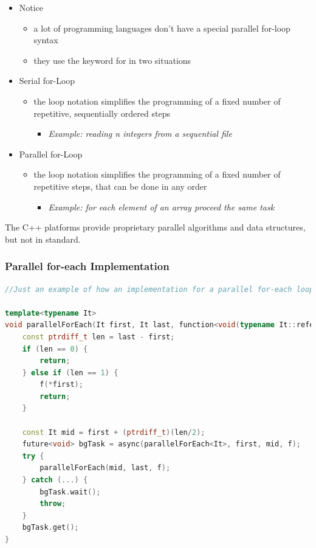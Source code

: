 \begin{itemize}
\tightlist
\item
  Notice

  \begin{itemize}
  \tightlist
  \item
    a lot of programming languages don't have a special parallel
    for-loop syntax
  \item
    they use the keyword for in two situations
  \end{itemize}
\item
  Serial for-Loop

  \begin{itemize}
  \tightlist
  \item
    the loop notation simplifies the programming of a fixed number of
    repetitive, sequentially ordered steps

    \begin{itemize}
    \tightlist
    \item
      \textit{Example: reading n integers from a sequential file}
    \end{itemize}
  \end{itemize}
\item
  Parallel for-Loop

  \begin{itemize}
  \tightlist
  \item
    the loop notation simplifies the programming of a fixed number of
    repetitive steps, that can be done in any order

    \begin{itemize}
    \tightlist
    \item
      \textit{Example: for each element of an array proceed the same task}
    \end{itemize}
  \end{itemize}
\end{itemize}

The C++ platforms provide proprietary parallel algorithms and data
structures, but not in standard.

\hypertarget{parallel-for-each-implementation}{%
\subsubsection{Parallel for-each
Implementation}\label{parallel-for-each-implementation}}

\begin{lstlisting}[language=C++]
//Just an example of how an implementation for a parallel for-each loop could look like.

template<typename It>
void parallelForEach(It first, It last, function<void(typename It::reference)> f) {
    const ptrdiff_t len = last - first;
    if (len == 0) {
        return;
    } else if (len == 1) {
        f(*first);
        return;
    }

    const It mid = first + (ptrdiff_t)(len/2);
    future<void> bgTask = async(parallelForEach<It>, first, mid, f);
    try {
        parallelForEach(mid, last, f);
    } catch (...) {
        bgTask.wait();
        throw;
    }
    bgTask.get();
}
\end{lstlisting}

